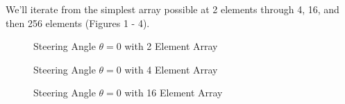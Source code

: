 \documentclass[12pt,a6paper]{book}
\begin{document}
We'll iterate from the simplest array possible at 2 elements through 4, 16, and then 256 elements (Figures 1 - 4). 

\begin{figure}[!htb]
\caption{\label{fig:my-label} Steering Angle $\theta=0$ with 2 Element Array}
\end{figure}

\begin{figure}[!htb]
\caption{\label{fig:my-label} Steering Angle $\theta=0$ with 4 Element Array}
\end{figure}

\begin{figure}[!htb]
\caption{\label{fig:my-label} Steering Angle $\theta=0$ with 16 Element Array}
\end{figure}
\end{document}
